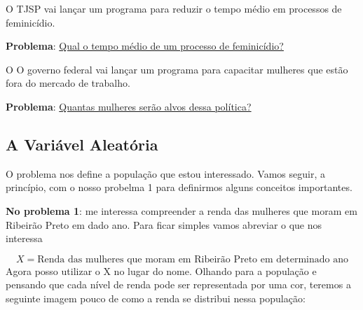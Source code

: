 \documentclass[
  letterpaper,
  DIV=11,
  numbers=noendperiod]{scrreprt}
\begin{document}
\begin{tcolorbox}[enhanced jigsaw, leftrule=.75mm, coltitle=black, colframe=quarto-callout-note-color-frame, toprule=.15mm, opacitybacktitle=0.6, bottomtitle=1mm, bottomrule=.15mm, titlerule=0mm, toptitle=1mm, title=\textcolor{quarto-callout-note-color}{\faInfo}\hspace{0.5em}{Problema 2}, arc=.35mm, breakable, opacityback=0, colbacktitle=quarto-callout-note-color!10!white, colback=white, left=2mm, rightrule=.15mm]

O TJSP vai lançar um programa para reduzir o tempo médio em processos de
feminicídio.

\textbf{Problema}: \ul{Qual o tempo médio de um processo de
feminicídio?}

\end{tcolorbox}

\begin{tcolorbox}[enhanced jigsaw, leftrule=.75mm, coltitle=black, colframe=quarto-callout-note-color-frame, toprule=.15mm, opacitybacktitle=0.6, bottomtitle=1mm, bottomrule=.15mm, titlerule=0mm, toptitle=1mm, title=\textcolor{quarto-callout-note-color}{\faInfo}\hspace{0.5em}{Problema 3}, arc=.35mm, breakable, opacityback=0, colbacktitle=quarto-callout-note-color!10!white, colback=white, left=2mm, rightrule=.15mm]

O O governo federal vai lançar um programa para capacitar mulheres que
estão fora do mercado de trabalho.

\textbf{Problema}: \ul{Quantas mulheres serão alvos dessa política?}

\end{tcolorbox}

\subsection{A Variável Aleatória}\label{a-variuxe1vel-aleatuxf3ria}

O problema nos define a população que estou interessado. Vamos seguir, a
princípio, com o nosso probelma 1 para definirmos alguns conceitos
importantes.

\textbf{No problema 1}: me interessa compreender a renda das mulheres
que moram em Ribeirão Preto em dado ano. Para ficar simples vamos
abreviar o que nos interessa

\[X=\text{Renda das mulheres que moram em Ribeirão Preto em determinado ano}\]
Agora posso utilizar o X no lugar do nome. Olhando para a população e
pensando que cada nível de renda pode ser representada por uma cor,
teremos a seguinte imagem pouco de como a renda se distribui nessa
população:
\end{document}

